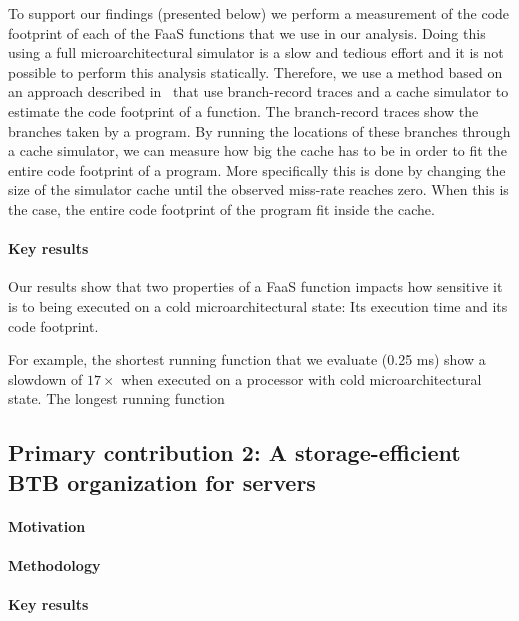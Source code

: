 \documentclass[../main.tex]{subfiles}
\begin{document}
\begin{refsection}
To support our findings (presented below) we perform a measurement of the code footprint of each of the FaaS functions that we use in our analysis. Doing this using a full microarchitectural simulator is a slow and tedious effort and it is not possible to perform this analysis statically. Therefore, we use a method based on an approach described in~\cite{splash2} that use branch-record traces and a cache simulator to estimate the code footprint of a function. The branch-record traces show the branches taken by a program. By running the locations of these branches through a cache simulator, we can measure how big the cache has to be in order to fit the entire code footprint of a program. More specifically this is done by changing the size of the simulator cache until the observed miss-rate reaches zero. When this is the case, the entire code footprint of the program fit inside the cache.



\paragraph{Key results}
Our results show that two properties of a FaaS function impacts how sensitive it is to being executed on a cold microarchitectural state: Its execution time and its code footprint.

For example, the shortest running function that we evaluate (0.25 ms) show a slowdown of $17\times$ when executed on a processor with cold microarchitectural state. The longest running function 

\subsection{Primary contribution 2: A storage-efficient BTB organization for servers}

\paragraph{Motivation}

\paragraph{Methodology}

\paragraph{Key results}



\end{refsection}
\end{document}
